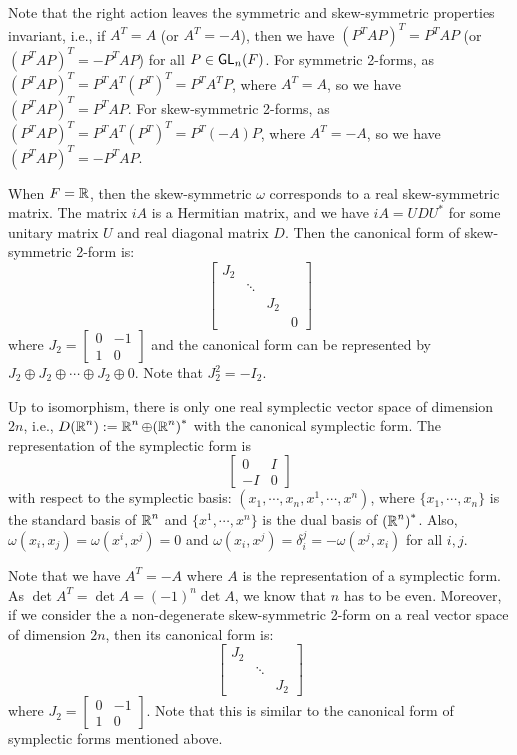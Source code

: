 Note that the right action leaves the symmetric and skew-symmetric properties invariant, i.e., if $A^T = A$ (or $A^T = -A$), then we have ${(P^T A P)}^T = P^T A P$ (or ${(P^T A P)}^T = -P^T A P$) for all $P \in \operatorname{\text{\normalfont\sffamily GL}}_n(F)$. For symmetric 2-forms, as ${(P^T A P)}^T = P^T A^T {(P^T)}^T = P^T A^T P$, where $A^T = A$, so we have ${(P^T A P)}^T = P^T A P$. For skew-symmetric 2-forms, as ${(P^T A P)}^T = P^T A^T {(P^T)}^T = P^T (-A) P$, where $A^T = -A$, so we have ${(P^T A P)}^T = -P^T A P$.

When $F = \operatorname{\mathbb{R}}$, then the skew-symmetric $\omega$ corresponds to a real skew-symmetric matrix. The matrix $iA$ is a Hermitian matrix, and we have $iA = U D U^*$ for some unitary matrix $U$ and real diagonal matrix $D$. Then the canonical form of skew-symmetric 2-form is:
\[
	\begin{bmatrix}
		J_2 &        &         \\
		    & \ddots           \\
		    &        & J_2     \\
		    &        &     & 0
	\end{bmatrix}
\]
where $J_2 = \begin{bmatrix} 0 & -1 \\ 1 & 0 \end{bmatrix}$ and the canonical form can be represented by $J_2 \oplus J_2 \oplus \cdots \oplus J_2 \oplus 0$. Note that $J_2^2 = -I_2$.

Up to isomorphism, there is only one real symplectic vector space of dimension $2n$, i.e., $D(\operatorname{\mathbb{R}}^n) := \operatorname{\mathbb{R}}^n \oplus {(\operatorname{\mathbb{R}}^n)}^*$ with the canonical symplectic form. The representation of the symplectic form is
\[
	\begin{bmatrix}
		0  & I \\
		-I & 0
	\end{bmatrix}
\]
with respect to the symplectic basis: $(x_1, \cdots, x_n, x^1, \cdots, x^n)$, where $\{ x_1, \cdots, x_n \}$ is the standard basis of $\operatorname{\mathbb{R}}^n$ and $\{ x^1, \cdots, x^n \}$ is the dual basis of ${(\operatorname{\mathbb{R}}^n)}^*$. Also, $\omega(x_i, x_j) = \omega(x^i, x^j) = 0$ and $\omega(x_i, x^j) = \delta_i^j = -\omega(x^j, x_i)$ for all $i, j$.

Note that we have $A^T = -A$ where $A$ is the representation of a symplectic form. As $\det A^T = \det A = {(-1)}^n \det A$, we know that $n$ has to be even. Moreover, if we consider the a non-degenerate skew-symmetric 2-form on a real vector space of dimension $2n$, then its canonical form is:
\[
	\begin{bmatrix}
		J_2 &        &     \\
		    & \ddots       \\
		    &        & J_2
	\end{bmatrix}
\]
where $J_2 = \begin{bmatrix} 0 & -1 \\ 1 & 0 \end{bmatrix}$. Note that this is similar to the canonical form of symplectic forms mentioned above.

